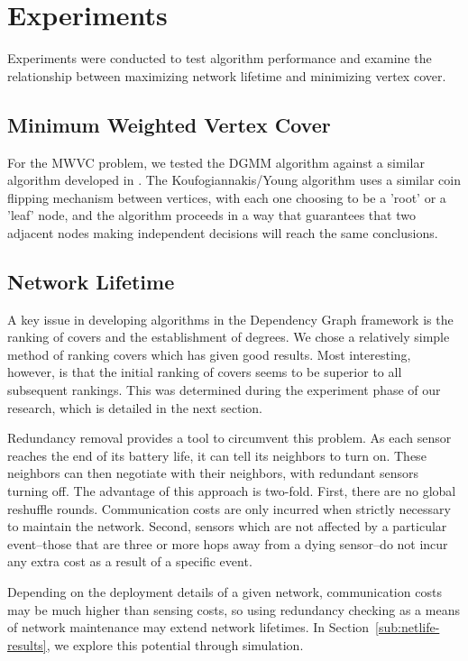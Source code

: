 \section{Experiments}
\label{sec:experiments}
Experiments were conducted to test algorithm performance and examine the relationship between maximizing network lifetime and minimizing vertex cover.
\subsection{Minimum Weighted Vertex Cover}
\label{sub:mwvc-exp}

For the MWVC problem, we tested the DGMM algorithm against a similar algorithm developed in \cite{1582746}. The Koufogiannakis/Young algorithm uses a similar coin flipping mechanism between vertices, with each one choosing to be a 'root' or a 'leaf' node, and the algorithm proceeds in a way that guarantees that two adjacent nodes making independent decisions will reach the same conclusions. 

\subsection{Network Lifetime}

A key issue in developing algorithms in the Dependency Graph framework is the ranking of covers and the establishment of degrees. We chose a relatively simple method of ranking covers which has given good results. Most interesting, however, is that the initial ranking of covers seems to be superior to all subsequent rankings. This was determined during the experiment phase of our research, which is detailed in the next section.

Redundancy removal provides a tool to circumvent this problem. As each sensor reaches the end of its battery life, it can tell its neighbors to turn on. These neighbors can then negotiate with their neighbors, with redundant sensors turning off. The advantage of this approach is two-fold. First, there are no global reshuffle rounds. Communication costs are only incurred when strictly necessary to maintain the network. Second, sensors which are not affected by a particular event--those that are three or more hops away from a dying sensor--do not incur any extra cost as a result of a specific event.

Depending on the deployment details of a given network, communication costs may be much higher than sensing costs, so using redundancy checking as a means of network maintenance may extend network lifetimes. In Section~\ref{sub:netlife-results}, we explore this potential through simulation.


